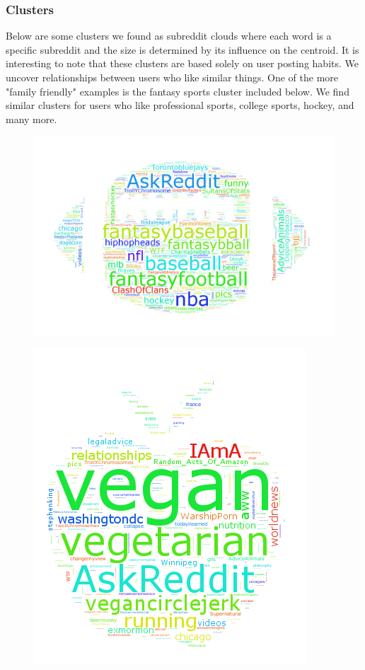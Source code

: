 \documentclass[12pt]{article}
\numberwithin{equation}{section}
\begin{document}
\subsubsection*{Clusters}
Below are some clusters we found as subreddit clouds where each word is a specific subreddit and the size is determined by its influence on the centroid.  It is interesting to note that these clusters are based solely on user posting habits.  We uncover relationships between users who like similar things.  One of the more "family friendly" examples is the fantasy sports cluster included below.  We find similar clusters for users who like professional sports, college sports, hockey, and many more.   
\begin{figure}[h!]
\centering
	\includegraphics[scale=.2]{football_95.png}
\end{figure}
\begin{figure}[h!]
	\centering
	\includegraphics[scale=.6]{vegan_30.png}
\end{figure}
\end{document}
